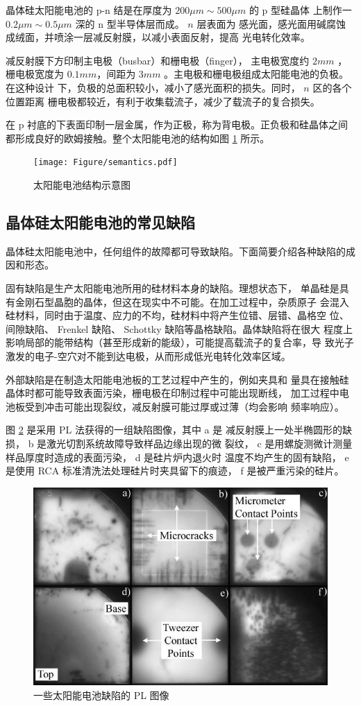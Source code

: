 晶体硅太阳能电池的 p-n 结是在厚度为 $200\mu m \sim 500\mu m$ 的 p 型硅晶体
上制作一 $0.2 \mu m \sim 0.5 \mu m$ 深的 n 型半导体层而成。 $n$ 层表面为
感光面，感光面用碱腐蚀成绒面，并喷涂一层减反射膜，以减小表面反射，提高
光电转化效率。

减反射膜下方印制主电极（busbar）和栅电极（finger），
主电极宽度约 $2mm$ ，栅电极宽度为
$0.1mm$，间距为 $3mm$ 。主电极和栅电极组成太阳能电池的负极。在这种设计
下，负极的总面积较小，减小了感光面积的损失。同时， $n$ 区的各个位置距离
栅电极都较近，有利于收集载流子，减少了载流子的复合损失。

在 p 衬底的下表面印制一层金属，作为正极，称为背电极。正负极和硅晶体之间
都形成良好的欧姆接触。整个太阳能电池的结构如图 \ref{fig:semantics} 所示。

\begin{figure}
\centering
\texttt{[image: Figure/semantics.pdf]}
\caption{太阳能电池结构示意图}
\label{fig:semantics}
\end{figure}

\subsection{晶体硅太阳能电池的常见缺陷}

晶体硅太阳能电池中，任何组件的故障都可导致缺陷。下面简要介绍各种缺陷的成
因和形态。

固有缺陷是生产太阳能电池所用的硅材料本身的缺陷。理想状态下，
单晶硅是具有金刚石型晶胞的晶体，但这在现实中不可能。在加工过程中，杂质原子
会混入硅材料，同时由于温度、应力的不均，硅材料中将产生位错、层错、晶格空
位、间隙缺陷、 Frenkel 缺陷、 Schottky 缺陷等晶格缺陷。晶体缺陷将在很大
程度上影响局部的能带结构（甚至形成新的能级），可能提高载流子的复合率，导
致光子激发的电子-空穴对不能到达电极，从而形成低光电转化效率区域。

外部缺陷是在制造太阳能电池板的工艺过程中产生的，例如夹具和
量具在接触硅晶体时都可能导致表面污染，栅电极在印制过程中可能出现断线，
加工过程中电池板受到冲击可能出现裂纹，减反射膜可能过厚或过薄（均会影响
频率响应）。

图 \ref{fig:PLimage} 是采用 PL 法获得的一组缺陷图像，其中 a 是 
减反射膜上一处半椭圆形的缺损， b 是激光切割系统故障导致样品边缘出现的微
裂纹， c 是用螺旋测微计测量样品厚度时造成的表面污染， d 是硅片炉内退火时
温度不均产生的固有缺陷， e 是使用 RCA 标准清洗法处理硅片时夹具留下的痕迹，
f 是被严重污染的硅片\cite{FastPL}。

\begin{figure}
\centering
\includegraphics[width=.6\textwidth]{Figure/PLimage.png}
\caption{一些太阳能电池缺陷的 PL 图像}
\label{fig:PLimage}
\end{figure}
